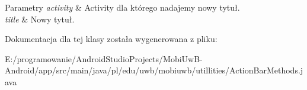 \begin{DoxyParams}{Parametry}
{\em activity} & Activity dla którego nadajemy nowy tytuł. \\
\hline
{\em title} & Nowy tytuł. \\
\hline
\end{DoxyParams}


Dokumentacja dla tej klasy została wygenerowana z pliku\+:\begin{DoxyCompactItemize}
\item 
E\+:/programowanie/\+Android\+Studio\+Projects/\+Mobi\+Uw\+B-\/\+Android/app/src/main/java/pl/edu/uwb/mobiuwb/utillities/Action\+Bar\+Methods.\+java\end{DoxyCompactItemize}
